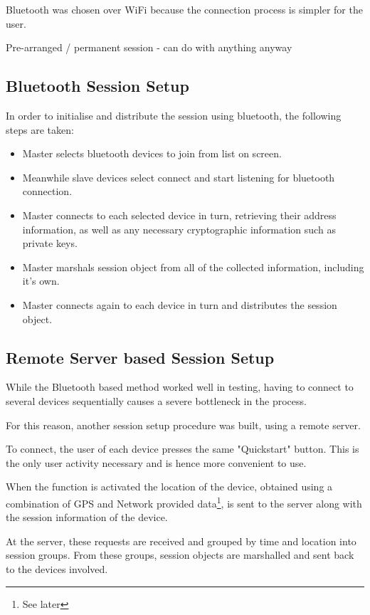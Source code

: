 Bluetooth was chosen over WiFi because the connection process is simpler for the user.

Pre-arranged / permanent session - can do with anything anyway

\subsection{Bluetooth Session Setup}
\label{bt setup}
In order to initialise and distribute the session using bluetooth, the following steps are taken:

\begin{itemize}
\item{Master selects bluetooth devices to join from list on screen.}
\item{Meanwhile slave devices select connect and start listening for bluetooth connection.}
\item{Master connects to each selected device in turn, retrieving their address information, as well as any necessary cryptographic information such as private keys.}
\item{Master marshals session object from all of the collected information, including it's own.}
\item{Master connects again to each device in turn and distributes the session object.}
\end{itemize}

\subsection{Remote Server based Session Setup}

While the Bluetooth based method worked well in testing, having to connect to several devices sequentially causes a severe bottleneck in the process.

For this reason, another session setup procedure was built, using a remote server.

To connect, the user of each device presses the same "Quickstart" button. This is the only user activity necessary and is hence more convenient to use.

When the function is activated the location of the device, obtained using a combination of GPS and Network provided data\footnote{See later}, is sent to the server along with the session information of the device.

At the server, these requests are received and grouped by time and location into session groups. From these groups, session objects are marshalled and sent back to the devices involved.

